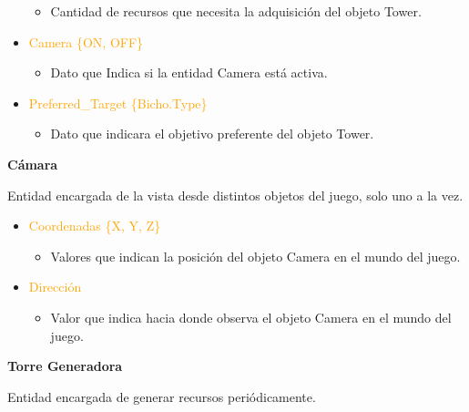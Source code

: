 \documentclass{article}
\begin{document}
\begin{itemize}
\begin{itemize}
        \item Cantidad de recursos que necesita la adquisición del objeto Tower.
    \end{itemize}
    \item \textcolor{Orange}{Camera \{ON, OFF\}}
    \begin{itemize}
        \item Dato que Indica si la entidad Camera está activa.
    \end{itemize}
    \item \textcolor{Orange}{Preferred\_Target \{Bicho.Type\}}
    \begin{itemize}
        \item Dato que indicara el objetivo preferente del objeto Tower.
    \end{itemize}
\end{itemize}

\noindent \textbf{Cámara}

\hfill \break \noindent Entidad encargada de la vista desde distintos objetos del juego, solo uno a la vez.

\begin{itemize}
    \item \textcolor{Orange}{Coordenadas \{X, Y, Z\}}
    \begin{itemize}
        \item Valores que indican la posición del objeto Camera en el mundo del juego.
    \end{itemize}
    \item \textcolor{Orange}{Dirección}
    \begin{itemize}
        \item Valor que indica hacia donde observa el objeto Camera en el mundo del juego.
    \end{itemize}
\end{itemize}

\noindent \textbf{Torre Generadora}

\hfill \break \noindent Entidad encargada de generar recursos periódicamente.
\end{document}
